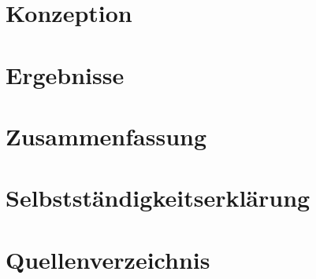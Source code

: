 \documentclass[a4paper, 12pt]{article}
\begin{document}

\section{Konzeption}
\label{sec:Konzeption}


\section{Ergebnisse}
\label{sec:Ergebnisse}


\section{Zusammenfassung}
\label{sec:Zusammenfassung}


\newpage
\section{Selbstständigkeitserklärung}

\newpage
\section{Quellenverzeichnis}
%
\printbibliography[keyword={internet},title={Internetseiten?}]
\printbibliography[keyword={buch},title={Literatur}]
\end{document}
